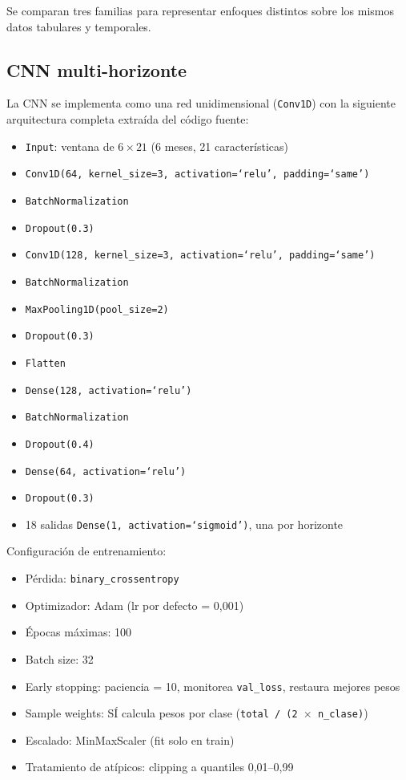 Se comparan tres familias para representar enfoques distintos sobre los mismos datos tabulares y temporales.

\subsection{CNN multi-horizonte}

La CNN se implementa como una red unidimensional (\texttt{Conv1D}) con la siguiente arquitectura completa extraída del código fuente:

\begin{itemize}
    \item \texttt{Input}: ventana de $6 \times 21$ (6 meses, 21 características)
    \item \texttt{Conv1D(64, kernel\_size=3, activation=`relu', padding=`same')}
    \item \texttt{BatchNormalization}
    \item \texttt{Dropout(0.3)}
    \item \texttt{Conv1D(128, kernel\_size=3, activation=`relu', padding=`same')}
    \item \texttt{BatchNormalization}
    \item \texttt{MaxPooling1D(pool\_size=2)}
    \item \texttt{Dropout(0.3)}
    \item \texttt{Flatten}
    \item \texttt{Dense(128, activation=`relu')}
    \item \texttt{BatchNormalization}
    \item \texttt{Dropout(0.4)}
    \item \texttt{Dense(64, activation=`relu')}
    \item \texttt{Dropout(0.3)}
    \item 18 salidas \texttt{Dense(1, activation=`sigmoid')}, una por horizonte
\end{itemize}

Configuración de entrenamiento:

\begin{itemize}
    \item Pérdida: \texttt{binary\_crossentropy}
    \item Optimizador: Adam (lr por defecto = 0,001)
    \item Épocas máximas: 100
    \item Batch size: 32
    \item Early stopping: paciencia = 10, monitorea \texttt{val\_loss}, restaura mejores pesos
    \item Sample weights: SÍ calcula pesos por clase (\texttt{total / (2 $\times$ n\_clase)})
    \item Escalado: MinMaxScaler (fit solo en train)
    \item Tratamiento de atípicos: clipping a quantiles 0,01--0,99
\end{itemize}

